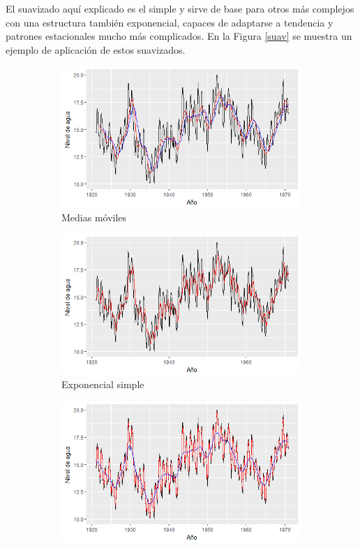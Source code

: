 El suavizado aquí explicado es el simple y sirve de base para otros más complejos con una estructura también exponencial, capaces de adaptarse a tendencia y patrones estacionales mucho más complicados. En la Figura \ref{suav} se muestra un ejemplo de aplicación de estos suavizados.
\begin{figure} [t]
\begin{subfigure}{.5\textwidth}
  \centering
  \includegraphics[width=.8\linewidth]{Images/Conceptos/ma.png}
  \caption{Medias móviles}
  \label{fig:sfig1}
\end{subfigure}
\begin{subfigure}{.5\textwidth}
  \centering
  \includegraphics[width=.8\linewidth]{Images/Conceptos/exp.png}
  \caption{Exponencial simple}
  \label{fig:sfig2}
\end{subfigure}
\begin{subfigure}{.5\textwidth}
  \centering
  \includegraphics[width=.8\linewidth]{Images/Conceptos/ker.png}

\end{subfigure}
\end{figure}
